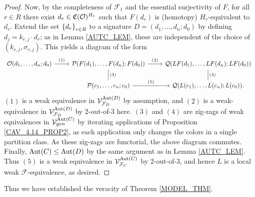 \documentclass[a4paper,10pt
,draft
]{article}%
\renewcommand{\F}{\mathcal F}
\newcommand{\Q}{\mathcal Q}
\renewcommand{\1}{\eta}%
\begin{document}
\begin{proof}
      Now, by the completeness of $\F_1$ and the essential surjectivity of $F$,
      for all $r \in R$ there exist $d_r \in \mathfrak C(\mathcal{O})^{H_r}$ such that
      $F(d_r)$ is (homotopy) $H_r$-equivalent to $d_r$.
      Extend the set $\left\{d_r\right\}_{r\in R}$ to a signature $D = (d_1,\ldots, d_n;d_0)$
      by defining $d_j = k_{r,j} \cdot d_r$;
      as in Lemma \ref{AUTC_LEM}, these are independent of the choice of $(k_{r,j}, \sigma_{r,j})$.
      This yields a diagram of the form
      \begin{equation}
            \label{TWOOFTHREE_EQ}
            \begin{tikzcd}
                  \O(d_1,\ldots, d_n;d_0) \arrow[r, "(1)"]
                  &
                  \P(F(d_1),\ldots, F(d_n); F(d_0)) \arrow[d,dash, "(3)"] \arrow[r, "(2)"]
                  &
                  \Q(LF(d_1),\ldots, LF(d_n);LF(d_0)) \arrow[d, dash, "(4)"]
                  \\
                  &
                  \P(c_1,\ldots, c_n;c_0) \arrow[r, "(5)"]
                  &
                  \Q(L(c_1),\ldots, L(c_n); L(c_0)).
            \end{tikzcd}
      \end{equation}
      $(1)$ is a weak equivalence in $\V^{\Aut(D)}_{\F_D}$ by assumption, and
      $(2)$ is a weak-equivalence in $\V^{\Aut(D)}_{\F_D}$ by 2-out-of-3 here.
      $(3)$ and $(4)$ are zig-zags of weak equivalences in $\mathcal V^{\operatorname{Aut}(C)}_{gen}$ by iterating applications of
      Proposition \ref{CAV_4.14_PROP2},
      as each application only changes the colors in a single partition class.
      As these zig-zags are functorial, the above diagram commutes.
      Finally, $\operatorname{Aut}(C) \leq \operatorname{Aut}(D)$ by the same argument as in Lemma \ref{AUTC_LEM}.
      Thus $(5)$ is a weak equivalence in $\V^{\Aut(C)}_{\F_C}$ by 2-out-of-3, and hence
      $L$ is a local weak $\F$-equivalence, as desired.
\end{proof}

Thus we have established the veracity of Theorem \ref{MODEL_THM}.












\end{document}
